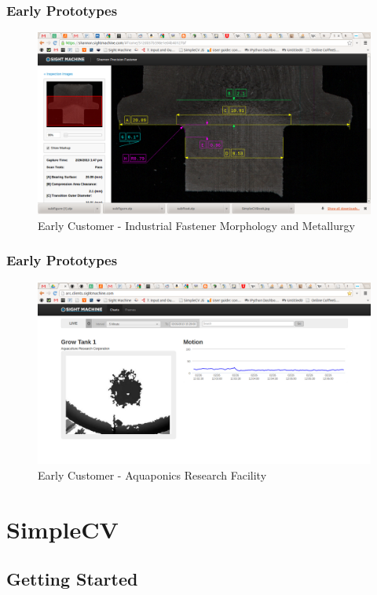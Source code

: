 \documentclass{beamer}
\begin{document}
\begin{frame}
\frametitle{Early Prototypes}

\begin{figure}
  \includegraphics[width=0.9\linewidth]{shannon.png}
  \caption{Early Customer - Industrial Fastener Morphology
      and Metallurgy }
\end{figure}

\end{frame}
\begin{frame}
\frametitle{Early Prototypes}

\begin{figure}
  \includegraphics[width=0.9\linewidth]{arc.png}
  \caption{Early Customer - Aquaponics Research Facility}
\end{figure}

\end{frame}

\section{SimpleCV}
\subsection{Getting Started}
\end{document}

